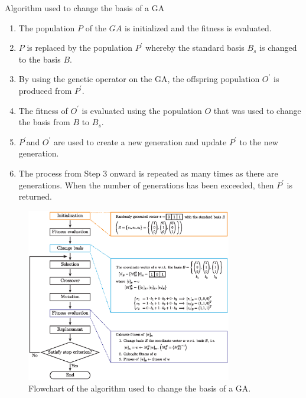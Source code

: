 \begin{algorithm}[H]
	\centering
	\caption{Algorithm used to change the basis of a GA} \label{alg:step}
	\begin{algorithmic}
		\State
		\begin{enumerate}[leftmargin=*, label=Step (\arabic*):]
			\item The population $ P $ of the $ GA $ is initialized and the fitness is evaluated.
			\item $ P $ is replaced by the population $ P^\prime $ whereby the standard basis $ B_s $ is changed to the basis $ B $.
			\item By using the genetic operator on the GA, the offspring population $ O^\prime $ is produced from $ P^\prime $.
			\item The fitness of $ O^\prime $ is evaluated using the population $ O $ that was used to change the basis from $ B $ to $ B_s $.
			\item $ P^\prime $and $ O^\prime $ are used to create a new generation and update $ P^\prime $ to the new generation.
			\item The process from Step 3 onward is repeated as many times as there are generations. When the number of generations has been exceeded, then $ P^\prime $ is returned.
		\end{enumerate}
	\end{algorithmic}
\end{algorithm}

\begin{figure}[ht!]
	\centering
	\includegraphics[width=0.8\textwidth]{./flowchart_change_basis}
	\caption{Flowchart of the algorithm used to change the basis of a GA.} \label{fig:flowchart}
\end{figure}

